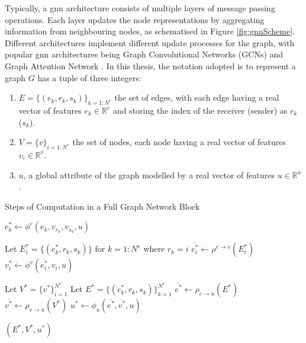 Typically, a \gls{gnn} architecture consists of multiple layers of message passing operations. Each layer updates the node representations by aggregating information from neighbouring nodes, as schematised in Figure \ref{fig:gnnScheme}. Different architectures implement different update processes for the graph, with popular \gls{gnn} architectures being Graph Convolutional Networks (GCNs) \cite{gcnPaper} and Graph Attention Network \cite{velickovic2018graph}. In this thesis, the notation adopted is to represent a graph $G$ has a tuple of three integers:
\begin{enumerate}
    \item $E = \{(e_k, r_k, s_k)\}_{k=1:N^e}$ the set of edges, with each edge having a real vector of features $e_k \in \mathbb{R}^e$ and storing the index of the receiver (sender) as $r_k$ ($s_k$).
    \item $V = \{v\}_{i=1:N^v}$ the set of nodes, each node having a real vector of features $v_i \in \mathbb{R}^v$.
    \item $u$, a global attribute of the graph modelled by a real vector of features $u \in \mathbb{R}^u$. 
\end{enumerate}

\begin{algorithm}
    \caption{Steps of Computation in a Full Graph Network Block \cite{graphInductiveBias}}
    \label{algo:graph_network}
    \begin{algorithmic}[1]
            \State $e^*_k \gets \phi^e(e_k, v_{r_k}, v_{s_k}, u)$
        \EndFor

            \State Let $E_i^* = \{(e^*_k, r_k, s_k)\}$ for $k = 1 : N^e$ where $r_k = i$
            \State $\overline{e^*_i} \gets \rho^{e \to v}(E^*_i)$
            \State $v^*_i \gets \phi^v(\overline{e^*_i}, v_i, u)$
        \EndFor

        \State Let $V^* = \{v^*\}_{i=1}^{N^v}$
        \State Let $E^* = \{(e^*_k, r_k, s_k)\}_{k=1}^{N^e}$
        \State $\overline{e^*} \gets \rho_{e \to u}(E^*)$
        \State $\overline{v^*} \gets \rho_{v \to u}(V^*)$
        \State $u^* \gets \phi_u(\overline{e^*}, \overline{v^*}, u)$

        \State \Return $(E^*, V^*, u^*)$
    \EndFunction
    \end{algorithmic}
\end{algorithm}

